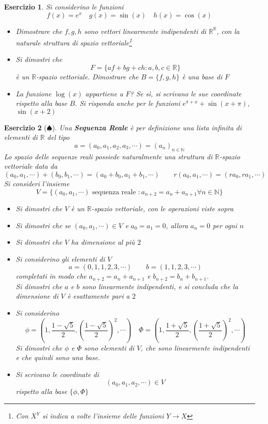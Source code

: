 \documentclass{article}
\newtheorem{es}{Esercizio}
\begin{document}
{\begin{es}
    Si considerino le funzioni $$f(x)=e^x\quad g(x)=\sin(x)\quad h(x)=\cos(x)$$
    \begin{itemize}
        \item Dimostrare che $f,g,h$ sono vettori linearmente indipendenti di $\mathbb{R}^{\mathbb{R}}$, con la naturale struttura di spazio vettoriale\footnote{Con $X^Y$ si indica a volte l'insieme delle funzioni $Y\to X$}
        \item Si dimostri che $$F=\{af+bg+ch:a,b,c\in\mathbb{R}\}$$ è un $\mathbb{R}$-spazio vettoriale. Dimostrare che $B=\{f,g,h\}$ è una base di $F$
        \item La funzione $\log(x)$ appartiene a $F$? Se sì, si scrivano le sue coordinate rispetto alla base $B$. Si risponda anche per le funzioni $e^{\pi+x}+\sin(x+\pi)$, $\sin(x+2)$
    \end{itemize}
\end{es}




\begin{es}[$\spadesuit$]
    Una \textbf{Sequenza Reale} è per definizione una lista infinita di elementi di $\mathbb{R} $ del tipo $$a=(a_0,a_1,a_2,a_3,\cdots)=(a_n)_{n\in\mathbb{N}}$$
    Lo spazio delle sequenze reali possiede naturalmente una struttura di $\mathbb{R}$-spazio vettoriale data da $$(a_0,a_1,\cdots)+(b_0,b_1,\cdots)=(a_0+b_0,a_1+b_1,\cdots)\qquad r(a_0,a_1,\cdots)=(ra_0,ra_1,\cdots)$$
    Si consideri l'insieme
    $$V=\{(a_0,a_1,\cdots) \text{ sequenza reale }: a_{n+2}=a_n+a_{n+1}\forall n\in \mathbb{N}\}$$
    \begin{itemize}
        \item Si dimostri che $V$ è un $\mathbb{R}$-spazio vettoriale, con le operazioni viste sopra
        \item Si dimostri che se $(a_0,a_1,\cdots)\in V$ e $a_0=a_1=0$, allora $a_n=0$ per ogni $n$
        \item Si dimostri che $V$ ha dimensione al più $2$
        \item Si considerino gli elementi di $V$
        $$a=(0,1,1,2,3,\cdots)\qquad b=(1,1,2,3,\cdots)$$
        completati in modo che $a_{n+2}=a_n+a_{n+1}$ e $b_{n+2}=b_n+b_{n+1}$.\\
        Si dimostri che $a$ e $b$ sono linearmente indipendenti, e si concluda che la dimensione di $V$ è esattamente pari a $2$
        \item Si considerino $$\phi=\left(1,\frac{1-\sqrt{5}}{2},\left(\frac{1-\sqrt{5}}{2}\right)^2,\cdots\right)\quad \Phi=\left(1,\frac{1+\sqrt{5}}{2},\left(\frac{1+\sqrt{5}}{2}\right)^2,\cdots\right)$$
        Si dimostri che $\phi$ e $\Phi$ sono elementi di $V$, che sono linearmente indipendenti e che quindi sono una base.
        \item Si scrivano le coordinate di $$(a_0,a_1,a_2,\cdots)\in V$$ rispetto alla base $\{\phi,\Phi\}$
    \end{itemize}
\end{es}


\newpage
}
\end{document}
